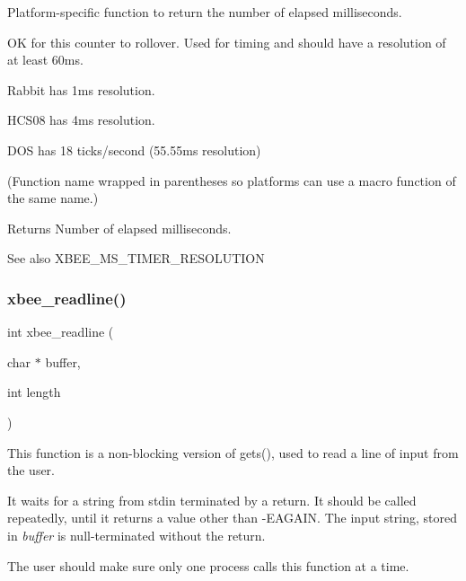 Platform-\/specific function to return the number of elapsed milliseconds. 

OK for this counter to rollover. Used for timing and should have a resolution of at least 60ms.


\begin{DoxyItemize}
\item Rabbit has 1ms resolution.
\item H\+C\+S08 has 4ms resolution.
\item D\+OS has 18 ticks/second (55.\+55ms resolution)
\end{DoxyItemize}

(Function name wrapped in parentheses so platforms can use a macro function of the same name.)

\begin{DoxyReturn}{Returns}
Number of elapsed milliseconds.
\end{DoxyReturn}
\begin{DoxySeeAlso}{See also}
X\+B\+E\+E\+\_\+\+M\+S\+\_\+\+T\+I\+M\+E\+R\+\_\+\+R\+E\+S\+O\+L\+U\+T\+I\+ON 
\end{DoxySeeAlso}
\mbox{\label{group__hal__dos_ga8c0c80b64f63d395e718172190b21fcc}} 
\subsubsection{\texorpdfstring{xbee\+\_\+readline()}{xbee\_readline()}}
{\footnotesize\ttfamily int xbee\+\_\+readline (\begin{DoxyParamCaption}\item[{char $\ast$}]{buffer,  }\item[{int}]{length }\end{DoxyParamCaption})}



This function is a non-\/blocking version of gets(), used to read a line of input from the user. 

It waits for a string from stdin terminated by a return. It should be called repeatedly, until it returns a value other than -\/\+E\+A\+G\+A\+IN. The input string, stored in {\itshape buffer} is null-\/terminated without the return.

The user should make sure only one process calls this function at a time.


